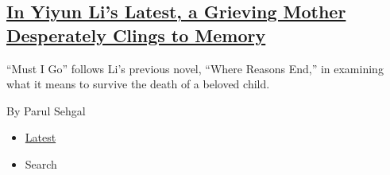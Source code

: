 \begin{enumerate}
{  \subsection{\texorpdfstring{\href{/2020/07/28/books/review-must-i-go-yiyun-li.html}{In
  Yiyun Li's Latest, a Grieving Mother Desperately Clings to
  Memory}}{In Yiyun Li's Latest, a Grieving Mother Desperately Clings to Memory}}\label{in-yiyun-lis-latest-a-grieving-mother-desperately-clings-to-memory}}

  ``Must I Go'' follows Li's previous novel, ``Where Reasons End,'' in
  examining what it means to survive the death of a beloved child.

  By Parul Sehgal
\end{enumerate}

\begin{itemize}
\tightlist
\item
  \protect\hyperlink{stream-panel}{Latest}
\item
  Search
\end{itemize}

